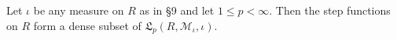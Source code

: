 Let $\iota$ be any measure on $R$ as in §9 and let $1 \leq p < \infty$. Then the step functions on $R$ form a dense subset of $\mathfrak{L}_p(R, \mathcal{M}_\iota, \iota)$.

